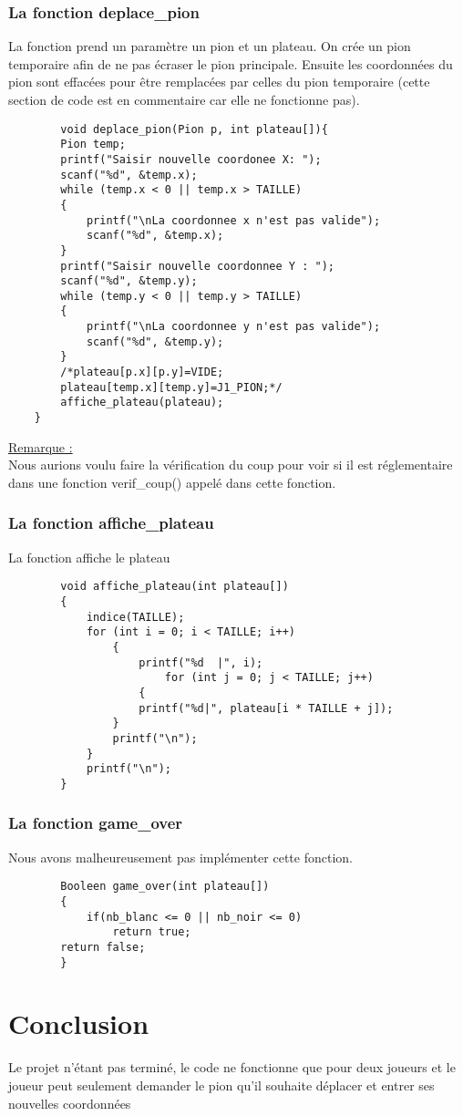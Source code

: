 \documentclass{article}
\begin{document}
    \subsubsection{La fonction deplace\_pion}
    La fonction prend un paramètre un pion et un plateau. On crée un pion temporaire afin de ne pas écraser le pion principale.
    Ensuite les coordonnées du pion sont effacées pour être remplacées par celles du pion temporaire (cette section de code est en commentaire car elle ne fonctionne pas).
    \begin{lstlisting}
        void deplace_pion(Pion p, int plateau[]){
        Pion temp;
        printf("Saisir nouvelle coordonee X: ");
        scanf("%d", &temp.x);
        while (temp.x < 0 || temp.x > TAILLE)
        {
            printf("\nLa coordonnee x n'est pas valide");
            scanf("%d", &temp.x);
        }
        printf("Saisir nouvelle coordonnee Y : ");
        scanf("%d", &temp.y);
        while (temp.y < 0 || temp.y > TAILLE)
        {
            printf("\nLa coordonnee y n'est pas valide");
            scanf("%d", &temp.y);
        }
        /*plateau[p.x][p.y]=VIDE;
        plateau[temp.x][temp.y]=J1_PION;*/
        affiche_plateau(plateau);
    }
    \end{lstlisting}
    \underline{Remarque : } \\ Nous aurions voulu faire la vérification du coup pour voir si il est réglementaire dans une fonction verif\_coup() appelé dans cette fonction.
    \newpage
    \subsubsection{La fonction affiche\_plateau}
    La fonction affiche le plateau 
    \begin{lstlisting}
        void affiche_plateau(int plateau[])
        {
            indice(TAILLE);
            for (int i = 0; i < TAILLE; i++)
                {
                    printf("%d  |", i);
                        for (int j = 0; j < TAILLE; j++)
                    {
                    printf("%d|", plateau[i * TAILLE + j]);
                }
                printf("\n");
            }
            printf("\n");
        }
    \end{lstlisting}
    \subsubsection{La fonction game\_over}
    Nous avons malheureusement pas implémenter cette fonction.
    \begin{lstlisting}
        Booleen game_over(int plateau[])
        {
            if(nb_blanc <= 0 || nb_noir <= 0)
                return true;
        return false;
        }
    \end{lstlisting}
    \section{Conclusion}
    Le projet n'étant pas terminé, le code ne fonctionne que pour deux joueurs et le joueur peut seulement demander le pion qu'il souhaite déplacer et entrer ses nouvelles coordonnées
\end{document}
